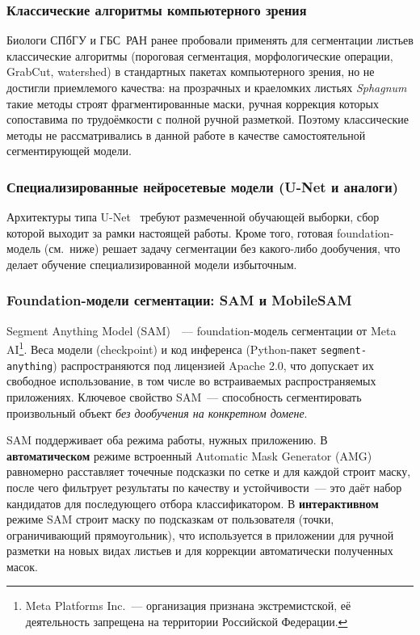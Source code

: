 \subsubsection*{Классические алгоритмы компьютерного зрения}

Биологи СПбГУ и ГБС~РАН ранее пробовали применять для сегментации листьев
классические алгоритмы (пороговая сегментация, морфологические операции,
GrabCut, watershed) в стандартных пакетах компьютерного зрения, но не
достигли приемлемого качества: на прозрачных и
краеломких листьях \textit{Sphagnum} такие методы строят фрагментированные
маски, ручная коррекция которых сопоставима по трудоёмкости с полной ручной
разметкой. Поэтому классические методы не рассматривались в данной работе
в качестве самостоятельной сегментирующей модели.

\subsubsection*{Специализированные нейросетевые модели (U-Net и аналоги)}

Архитектуры типа U-Net~\cite{Ronneberger2015} требуют размеченной обучающей выборки,
сбор которой выходит за рамки настоящей работы. Кроме того, готовая foundation-модель
(см.\ ниже) решает задачу сегментации без какого-либо дообучения, что делает обучение
специализированной модели избыточным.

\subsubsection*{Foundation-модели сегментации: SAM и MobileSAM}

Segment Anything Model (SAM)~\cite{Kirillov2023}~--- foundation-модель сегментации от
Meta AI\footnote{Meta Platforms Inc.~--- организация признана экстремистской,
её деятельность запрещена на территории Российской Федерации.}. Веса модели (checkpoint) и код инференса (Python-пакет
\texttt{segment-anything}) распространяются под лицензией Apache 2.0, что допускает их
свободное использование, в том числе во встраиваемых распространяемых приложениях.
Ключевое свойство SAM~--- способность сегментировать произвольный объект
\textit{без дообучения на конкретном домене}.

SAM поддерживает оба режима работы, нужных приложению. В \textbf{автоматическом} режиме
встроенный Automatic Mask Generator (AMG) равномерно расставляет точечные подсказки по
сетке и для каждой строит маску, после чего фильтрует результаты по качеству и
устойчивости~--- это даёт набор кандидатов для последующего отбора классификатором.
В \textbf{интерактивном} режиме SAM строит маску по подсказкам от пользователя (точки,
ограничивающий прямоугольник), что используется в приложении для ручной разметки на новых
видах листьев и для коррекции автоматически полученных масок.

